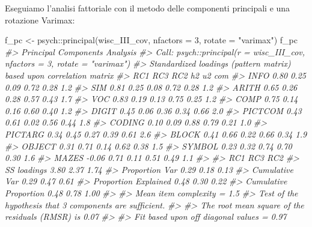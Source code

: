 \documentclass[
  11pt,
]{krantz}
\makeatletter
\newenvironment{Shaded}{\begin{snugshade}}{\end{snugshade}}
\newcommand{\AttributeTok}[1]{\textcolor[rgb]{0.61,0.61,0.61}{#1}}
\newcommand{\CommentTok}[1]{\textcolor[rgb]{0.37,0.37,0.37}{\textit{#1}}}
\newcommand{\DecValTok}[1]{\textcolor[rgb]{0.06,0.06,0.06}{#1}}
\newcommand{\FunctionTok}[1]{\textcolor[rgb]{0,0,0}{#1}}
\newcommand{\NormalTok}[1]{#1}
\newcommand{\OtherTok}[1]{\textcolor[rgb]{0.37,0.37,0.37}{#1}}
\newcommand{\SpecialCharTok}[1]{\textcolor[rgb]{0,0,0}{#1}}
\newcommand{\StringTok}[1]{\textcolor[rgb]{0.5,0.5,0.5}{#1}}
\newenvironment{kframe}{%
\medskip{}
\setlength{\fboxsep}{.8em}
 \def\at@end@of@kframe{}%
 \ifinner\ifhmode%
  \def\at@end@of@kframe{\end{minipage}}%
  \begin{minipage}{\columnwidth}%
 \fi\fi%
 \def\FrameCommand##1{\hskip\@totalleftmargin \hskip-\fboxsep
 \colorbox{shadecolor}{##1}\hskip-\fboxsep
     \hskip-\linewidth \hskip-\@totalleftmargin \hskip\columnwidth}%
 \MakeFramed {\advance\hsize-\width
   \@totalleftmargin\z@ \linewidth\hsize
   \@setminipage}}%
 {\par\unskip\endMakeFramed%
 \at@end@of@kframe}
\renewenvironment{Shaded}{\begin{kframe}}{\end{kframe}}
\makeatother
\begin{document}
Eseguiamo l'analisi fattoriale con il metodo delle componenti principali e una rotazione Varimax:

\begin{Shaded}
\begin{Highlighting}[]
\NormalTok{f\_pc }\OtherTok{\textless{}{-}}\NormalTok{ psych}\SpecialCharTok{::}\FunctionTok{principal}\NormalTok{(wisc\_III\_cov, }\AttributeTok{nfactors =} \DecValTok{3}\NormalTok{, }\AttributeTok{rotate =} \StringTok{"varimax"}\NormalTok{)}
\NormalTok{f\_pc}
\CommentTok{\#\textgreater{} Principal Components Analysis}
\CommentTok{\#\textgreater{} Call: psych::principal(r = wisc\_III\_cov, nfactors = 3, rotate = "varimax")}
\CommentTok{\#\textgreater{} Standardized loadings (pattern matrix) based upon correlation matrix}
\CommentTok{\#\textgreater{}           RC1  RC3  RC2   h2   u2 com}
\CommentTok{\#\textgreater{} INFO     0.80 0.25 0.09 0.72 0.28 1.2}
\CommentTok{\#\textgreater{} SIM      0.81 0.25 0.08 0.72 0.28 1.2}
\CommentTok{\#\textgreater{} ARITH    0.65 0.26 0.28 0.57 0.43 1.7}
\CommentTok{\#\textgreater{} VOC      0.83 0.19 0.13 0.75 0.25 1.2}
\CommentTok{\#\textgreater{} COMP     0.75 0.14 0.16 0.60 0.40 1.2}
\CommentTok{\#\textgreater{} DIGIT    0.45 0.06 0.36 0.34 0.66 2.0}
\CommentTok{\#\textgreater{} PICTCOM  0.43 0.61 0.02 0.56 0.44 1.8}
\CommentTok{\#\textgreater{} CODING   0.10 0.09 0.88 0.79 0.21 1.0}
\CommentTok{\#\textgreater{} PICTARG  0.34 0.45 0.27 0.39 0.61 2.6}
\CommentTok{\#\textgreater{} BLOCK    0.41 0.66 0.22 0.66 0.34 1.9}
\CommentTok{\#\textgreater{} OBJECT   0.31 0.71 0.14 0.62 0.38 1.5}
\CommentTok{\#\textgreater{} SYMBOL   0.23 0.32 0.74 0.70 0.30 1.6}
\CommentTok{\#\textgreater{} MAZES   {-}0.06 0.71 0.11 0.51 0.49 1.1}
\CommentTok{\#\textgreater{} }
\CommentTok{\#\textgreater{}                        RC1  RC3  RC2}
\CommentTok{\#\textgreater{} SS loadings           3.80 2.37 1.74}
\CommentTok{\#\textgreater{} Proportion Var        0.29 0.18 0.13}
\CommentTok{\#\textgreater{} Cumulative Var        0.29 0.47 0.61}
\CommentTok{\#\textgreater{} Proportion Explained  0.48 0.30 0.22}
\CommentTok{\#\textgreater{} Cumulative Proportion 0.48 0.78 1.00}
\CommentTok{\#\textgreater{} }
\CommentTok{\#\textgreater{} Mean item complexity =  1.5}
\CommentTok{\#\textgreater{} Test of the hypothesis that 3 components are sufficient.}
\CommentTok{\#\textgreater{} }
\CommentTok{\#\textgreater{} The root mean square of the residuals (RMSR) is  0.07 }
\CommentTok{\#\textgreater{} }
\CommentTok{\#\textgreater{} Fit based upon off diagonal values = 0.97}
\end{Highlighting}
\end{Shaded}
\end{document}
